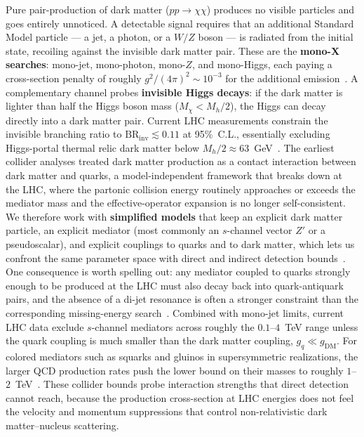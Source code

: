Pure pair-production of dark matter ($pp \to \chi\chi$) produces no visible particles and goes entirely unnoticed.
A detectable signal requires that an additional Standard Model particle --- a jet, a photon, or a $W/Z$ boson --- is radiated from the initial state, recoiling against the invisible dark matter pair.
These are the \textbf{mono-X searches}: mono-jet, mono-photon, mono-$Z$, and mono-Higgs, each paying a cross-section penalty of roughly $g^2/(4\pi)^2 \sim 10^{-3}$ for the additional emission~\cite{Cirelli:2024ssz}.
A complementary channel probes \textbf{invisible Higgs decays}: if the dark matter is lighter than half the Higgs boson mass ($M_\chi < M_h/2$), the Higgs can decay directly into a dark matter pair.
Current LHC measurements constrain the invisible branching ratio to $\text{BR}_\text{inv} \lesssim 0.11$ at 95\%~C.L., essentially excluding Higgs-portal thermal relic dark matter below $M_h/2 \approx 63$~GeV~\cite{ATLAS:2023tkt,Cirelli:2024ssz}.
The earliest collider analyses treated dark matter production as a contact interaction between dark matter and quarks, a model-independent framework that breaks down at the LHC, where the partonic collision energy routinely approaches or exceeds the mediator mass and the effective-operator expansion is no longer self-consistent.
We therefore work with \textbf{simplified models} that keep an explicit dark matter particle, an explicit mediator (most commonly an $s$-channel vector $Z'$ or a pseudoscalar), and explicit couplings to quarks and to dark matter, which lets us confront the same parameter space with direct and indirect detection bounds~\cite{Boveia:2018yeb}.
One consequence is worth spelling out: any mediator coupled to quarks strongly enough to be produced at the LHC must also decay back into quark-antiquark pairs, and the absence of a di-jet resonance is often a stronger constraint than the corresponding missing-energy search~\cite{Boveia:2018yeb}.
Combined with mono-jet limits, current LHC data exclude $s$-channel mediators across roughly the $0.1$--$4$~TeV range unless the quark coupling is much smaller than the dark matter coupling, $g_q \ll g_\text{DM}$.
For colored mediators such as squarks and gluinos in supersymmetric realizations, the larger QCD production rates push the lower bound on their masses to roughly $1$--$2$~TeV~\cite{Cirelli:2024ssz,Hooper:2024}.
These collider bounds probe interaction strengths that direct detection cannot reach, because the production cross-section at LHC energies does not feel the velocity and momentum suppressions that control non-relativistic dark matter--nucleus scattering.

